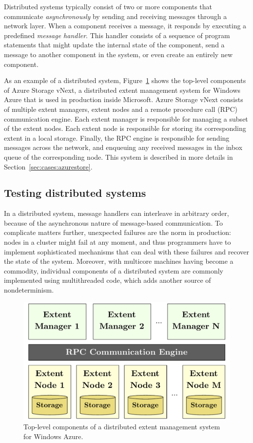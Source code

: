 Distributed systems typically consist of two or more components that communicate \emph{asynchronously} by sending and receiving messages through a network layer. When a component receives a message, it responds by executing a predefined \emph{message handler}. This handler consists of a sequence of program statements that might update the internal state of the component, send a message to another component in the system, or even create an entirely new component.

As an example of a distributed system, Figure~\ref{fig:azurestore} shows the top-level components of Azure Storage vNext, a distributed extent management system for Windows Azure that is used in production inside Microsoft. Azure Storage vNext consists of multiple extent managers, extent nodes and a remote procedure call (RPC) communication engine. Each extent manager is responsible for managing a subset of the extent nodes. Each extent node is responsible for storing its corresponding extent in a local storage. Finally, the RPC engine is responsible for sending messages across the network, and enqueuing any received messages in the inbox queue of the corresponding node. This system is described in more details in Section~\ref{sec:cases:azurestore}.

\subsection{Testing distributed systems}
\label{sec:overview:bugs}

In a distributed system, message handlers can interleave in arbitrary order, because of the asynchronous nature of message-based communication. To complicate matters further, unexpected failures are the norm in production: nodes in a cluster might fail at any moment, and thus programmers have to implement sophisticated mechanisms that can deal with these failures and recover the state of the system. Moreover, with multicore machines having become a commodity, individual components of a distributed system are commonly implemented using multithreaded code, which adds another source of nondeterminism.

\begin{figure}[t]
\centering
\includegraphics[width=\linewidth]{img/azurestore}
\caption{Top-level components of a distributed extent management system for Windows Azure.}
\label{fig:azurestore}
\end{figure}

